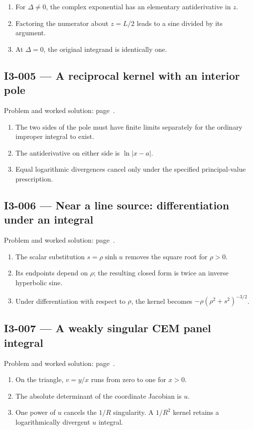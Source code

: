 \documentclass[11pt,oneside,openany]{book}
\begin{document}
\begin{enumerate}
\item For \(\Delta\ne0\), the complex exponential has an elementary antiderivative in \(z\).
\item Factoring the numerator about \(z=L/2\) leads to a sine divided by its argument.
\item At \(\Delta=0\), the original integrand is identically one.
\end{enumerate}
\subsection*{I3-005 --- A reciprocal kernel with an interior pole}
\label{hints:I3-005}
Problem and worked solution: page~\pageref{problem:I3-005}.

\begin{enumerate}
\item The two sides of the pole must have finite limits separately for the ordinary improper integral to exist.
\item The antiderivative on either side is \(\ln|x-a|\).
\item Equal logarithmic divergences cancel only under the specified principal-value prescription.
\end{enumerate}
\subsection*{I3-006 --- Near a line source: differentiation under an integral}
\label{hints:I3-006}
Problem and worked solution: page~\pageref{problem:I3-006}.

\begin{enumerate}
\item The scalar substitution \(s=\rho\sinh u\) removes the square root for \(\rho>0\).
\item Its endpoints depend on \(\rho\); the resulting closed form is twice an inverse hyperbolic sine.
\item Under differentiation with respect to \(\rho\), the kernel becomes \(-\rho(\rho^2+s^2)^{-3/2}\).
\end{enumerate}
\subsection*{I3-007 --- A weakly singular CEM panel integral}
\label{hints:I3-007}
Problem and worked solution: page~\pageref{problem:I3-007}.

\begin{enumerate}
\item On the triangle, \(v=y/x\) runs from zero to one for \(x>0\).
\item The absolute determinant of the coordinate Jacobian is \(u\).
\item One power of \(u\) cancels the \(1/R\) singularity. A \(1/R^2\) kernel retains a logarithmically divergent \(u\) integral.
\end{enumerate}
\end{document}
